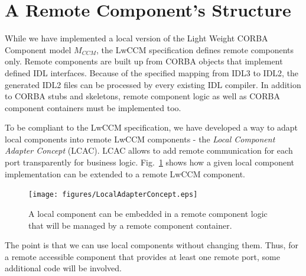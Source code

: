 
\section{A Remote Component's Structure}

While we have implemented a local version of the Light Weight CORBA Component 
model $M_{CCM}$, the LwCCM specification defines remote components only.
Remote components are built up from CORBA objects that implement defined
IDL interfaces.
Because of the specified mapping from IDL3 to IDL2, the generated IDL2 files 
can be processed by every existing IDL compiler. In addition to CORBA stubs
and skeletons, remote component logic as well as CORBA component containers
must be implemented too. 

To be compliant to the LwCCM specification, we have developed a way to
adapt local components into remote LwCCM components - the 
{\it Local Component Adapter Concept} (LCAC).
LCAC allows to add remote communication
for each port transparently for business logic.
Fig.~\ref{LcacOverview} shows how a given local component implementation
can be extended to a remote LwCCM component.

\begin{figure}[htbp]
    \begin{center}
    \texttt{[image: figures/LocalAdapterConcept.eps]}
    \caption{A local component can be embedded in a remote component logic
    that will be managed by a remote component container.}
    \label{LcacOverview}            
    \end{center}
\end{figure}

\noindent
The point is that we can use local components without changing them.
Thus, for a remote accessible component that provides at least one remote 
port, some additional code will be involved.

